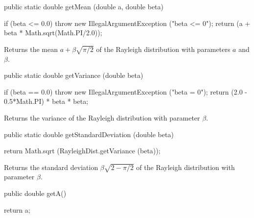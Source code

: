 \begin{code}

   public static double getMean (double a, double beta)\begin{hide} {
      if (beta <= 0.0)
         throw new IllegalArgumentException ("beta <= 0");
      return (a + beta * Math.sqrt(Math.PI/2.0));
   }\end{hide}
\end{code}
\begin{tabb} Returns the mean $a + \beta\sqrt{\pi/2}$ of the
   Rayleigh distribution with parameters $a$ and $\beta$.
\end{tabb}
\begin{htmlonly}
\end{htmlonly}
\begin{code}

   public static double getVariance (double beta)\begin{hide} {
      if (beta == 0.0)
        throw new IllegalArgumentException ("beta = 0");
      return (2.0 - 0.5*Math.PI) * beta * beta;
   }\end{hide}
\end{code}
\begin{tabb} Returns the variance
   of the Rayleigh distribution with parameter $\beta$.
\end{tabb}
\begin{htmlonly}
\end{htmlonly}
\begin{code}

   public static double getStandardDeviation (double beta)\begin{hide} {
      return Math.sqrt (RayleighDist.getVariance (beta));
   }\end{hide}
\end{code}
\begin{tabb} Returns the standard deviation $\beta\sqrt{2 - \pi/2}$ of
  the Rayleigh distribution with parameter $\beta$.
\end{tabb}
\begin{htmlonly}
\end{htmlonly}
\begin{code}

   public double getA()\begin{hide} {
      return a;
   }\end{hide}
\end{code} 
